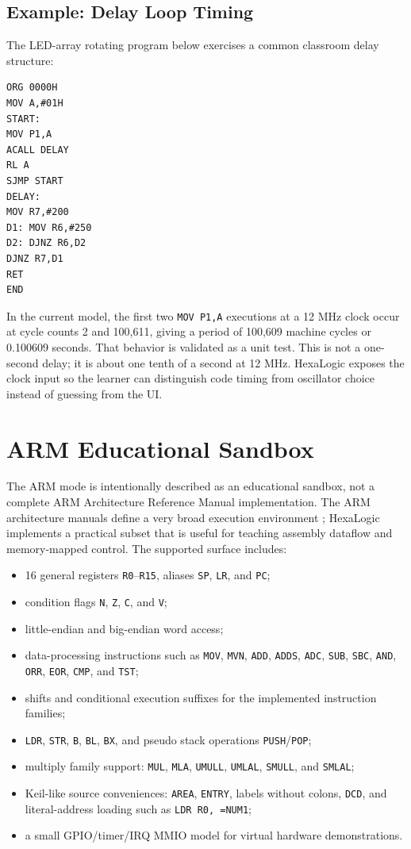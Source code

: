 \documentclass[conference]{IEEEtran}
\begin{document}
\subsection{Example: Delay Loop Timing}
The LED-array rotating program below exercises a common classroom delay structure:

\begin{verbatim}
ORG 0000H
MOV A,#01H
START:
MOV P1,A
ACALL DELAY
RL A
SJMP START
DELAY:
MOV R7,#200
D1: MOV R6,#250
D2: DJNZ R6,D2
DJNZ R7,D1
RET
END
\end{verbatim}

In the current model, the first two \texttt{MOV P1,A} executions at a 12 MHz clock occur at cycle counts 2 and 100,611, giving a period of 100,609 machine cycles or 0.100609 seconds. That behavior is validated as a unit test. This is not a one-second delay; it is about one tenth of a second at 12 MHz. HexaLogic exposes the clock input so the learner can distinguish code timing from oscillator choice instead of guessing from the UI.

\section{ARM Educational Sandbox}
The ARM mode is intentionally described as an educational sandbox, not a complete ARM Architecture Reference Manual implementation. The ARM architecture manuals define a very broad execution environment \cite{arm_arm}; HexaLogic implements a practical subset that is useful for teaching assembly dataflow and memory-mapped control. The supported surface includes:

\begin{itemize}
\item 16 general registers \texttt{R0}--\texttt{R15}, aliases \texttt{SP}, \texttt{LR}, and \texttt{PC};
\item condition flags \texttt{N}, \texttt{Z}, \texttt{C}, and \texttt{V};
\item little-endian and big-endian word access;
\item data-processing instructions such as \texttt{MOV}, \texttt{MVN}, \texttt{ADD}, \texttt{ADDS}, \texttt{ADC}, \texttt{SUB}, \texttt{SBC}, \texttt{AND}, \texttt{ORR}, \texttt{EOR}, \texttt{CMP}, and \texttt{TST};
\item shifts and conditional execution suffixes for the implemented instruction families;
\item \texttt{LDR}, \texttt{STR}, \texttt{B}, \texttt{BL}, \texttt{BX}, and pseudo stack operations \texttt{PUSH}/\texttt{POP};
\item multiply family support: \texttt{MUL}, \texttt{MLA}, \texttt{UMULL}, \texttt{UMLAL}, \texttt{SMULL}, and \texttt{SMLAL};
\item Keil-like source conveniences: \texttt{AREA}, \texttt{ENTRY}, labels without colons, \texttt{DCD}, and literal-address loading such as \texttt{LDR R0, =NUM1};
\item a small GPIO/timer/IRQ MMIO model for virtual hardware demonstrations.
\end{itemize}
\end{document}
